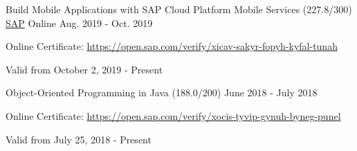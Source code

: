 
\begin{cventries}

\vspace{-0.25cm}

  \cventry
    {Build Mobile Applications with SAP Cloud Platform Mobile Services (227.8/300)} %
    {\href{https://www.sap.com/index.html}{SAP}} %
    {Online} %
    {Aug. 2019 - Oct. 2019} %
    {
	    \begin{cvitems} %
        \item[] {Online Certificate: \url{https://open.sap.com/verify/xicav-sakyr-fopyh-kyfal-tunah}} %
        \item[] {Valid from October 2, 2019 - Present} %
      \end{cvitems}
    }
    \vspace{-0.1cm}
  \cventry
    {Object-Oriented Programming in Java (188.0/200)} %
    {} %
    {} %
    {June 2018 - July 2018} %
    {
	    \begin{cvitems} %
        \item[] {Online Certificate: \url{https://open.sap.com/verify/xocis-tyvip-gynuh-byneg-punel}} %
        \item[] {Valid from July 25, 2018 - Present} %
      \end{cvitems}
    }   
    \vspace{-0.1cm}

\end{cventries}
